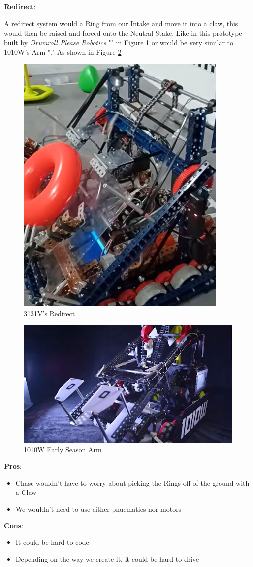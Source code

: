 \noindent
\textbf{Redirect}:

A redirect system would a Ring from our Intake and move it into a claw, this would then be raised and forced onto the Neutral Stake. Like in this prototype built by \textit{Drumroll Please Robotics} "\cite{Drumroll}" in Figure \ref{fig:drumroll} or would be very similar to 1010W's Arm "\cite{1010W}." As shown in Figure \ref{fig:1010W-arm}
\begin{figure}[H]
    \centering
    \includegraphics[width=0.5\linewidth]{images/Drumroll Redirect.png}
    \caption{3131V's Redirect}
    \label{fig:drumroll}
\end{figure}

\begin{figure} [H]
    \centering
    \includegraphics[width=0.5\linewidth]{images/1010W Arm.png}
    \caption{1010W Early Season Arm}
    \label{fig:1010W-arm}
\end{figure}


\noindent
\textbf{Pros}:
\begin{itemize}
    \item Chase wouldn't have to worry about picking the Rings off of the ground with a Claw
    \item We wouldn't need to use either pnuematics nor motors  
\end{itemize}
\textbf{Cons}:
\begin{itemize}
    \item It could be hard to code 
    \item Depending on the way we create it, it could be hard to drive
\end{itemize}

